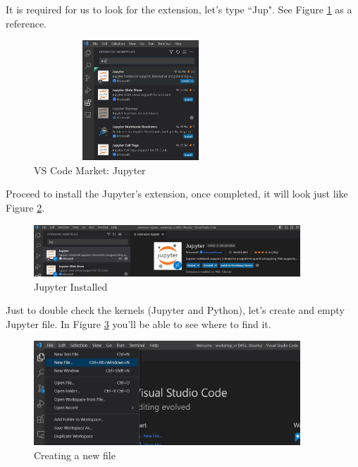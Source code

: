 \documentclass{assignment}
\begin{document}
It is required for us to look for the extension, let's type ``Jup". See Figure \ref{fig:market_jupyter} as a reference.

\begin{figure}[h]
 \centering 
    \includegraphics[width=8cm, height=4.5cm]{assets/vs_code_market_place_jupyter.JPG}
    \caption{VS Code Market: Jupyter}
    \label{fig:market_jupyter}
\end{figure}

Proceed to install the Jupyter's extension, once completed, it will look just like Figure \ref{fig:jup_installed}.

\begin{figure}[h]
 \centering 
    \includegraphics[width=10cm]{assets/vs_code_jupyter_installed.JPG}
    \caption{Jupyter Installed}
    \label{fig:jup_installed}
\end{figure}

Just to double check the kernels (Jupyter and Python), let's create and empty Jupyter file. In Figure \ref{fig:new_file_0} you'll be able to see where to find it.

\begin{figure}[h]
 \centering 
    \includegraphics[width=10cm]{assets/vs_code_new_file_1.JPG}
    \caption{Creating a new file}
    \label{fig:new_file_0}
\end{figure}

\newpage
\end{document}

